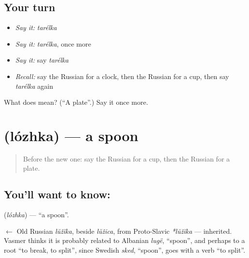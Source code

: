 \subsection*{Your turn}
\begin{itemize}
\raggedright
  \item \emph{Say it:} \emph{tarélka}
  \item \emph{Say it:} \emph{tarélka}, once more
  \item \emph{Say it:} say \emph{tarélka}
  \item \emph{Recall:} say the Russian for a clock, then the Russian for a cup, then say \emph{tarélka} again
\end{itemize}

\begin{tcolorbox}[breakable,colback=teal!4,colframe=teal!35!black,title={Before you move on}]
What does  mean? (\textquotedblleft{}A plate\textquotedblright{}.) Say it once more.
\end{tcolorbox}
\section[\texorpdfstring{\ru{ложка} (lózhka)}{ложка (lózhka)}]{ (lózhka) — a spoon}

\label{lesson:RU-C51-spoon}



\begin{quote}
Before the new one: say the Russian for a cup, then the Russian for a plate.
\end{quote}

\subsection*{You'll want to know: }
\textbf{} (\emph{lózhka}) — \textquotedblleft{}a spoon\textquotedblright{}.

\begin{cousinweb}
\textbf{} $\leftarrow$ Old Russian \emph{lŭžĭka}, beside \emph{lŭžica}, from Proto-Slavic \emph{*lŭžĭka} — inherited. Vasmer thinks it is probably related to Albanian \emph{lugë}, \textquotedblleft{}spoon\textquotedblright{}, and perhaps to a root \textquotedblleft{}to break, to split\textquotedblright{}, since Swedish \emph{sked}, \textquotedblleft{}spoon\textquotedblright{}, goes with a verb \textquotedblleft{}to split\textquotedblright{}.
\end{cousinweb}

